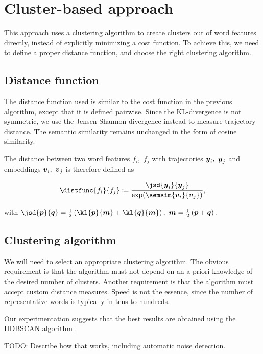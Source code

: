 \section{Cluster-based approach}
This approach uses a clustering algorithm to create clusters out of word features directly, instead of explicitly minimizing a cost function. To achieve this, we need to define a proper distance function, and choose the right clustering algorithm.

\subsection{Distance function}
The distance function used is similar to the cost function in the previous algorithm, except that it is defined pairwise. Since the KL-divergence is not symmetric, we use the Jensen-Shannon divergence instead to measure trajectory distance. The semantic similarity remains unchanged in the form of cosine similarity.

The distance between two word features $f_{i}$,\ $f_{j}$ with trajectories $\vect{\traj}_{i},\ \vect{\traj}_{j}$ and embeddings $\embed_{i},\ \embed_{j}$ is therefore defined as

\begin{equation}
	\distfunc{f_{i}}{f_{j}} \coloneqq \frac{\jsd{\vect{\traj}_{i}}{\vect{\traj}_{j}}}{\exp(\semsim{\embed_{i}}{\embed_{j}})},
\end{equation}

with $\jsd{\vect{p}}{\vect{q}} = \frac{1}{2} \left( \kl{\vect{p}}{\vect{m}} + \kl{\vect{q}}{\vect{m}} \right) ,\ \vect{m} = \frac{1}{2} \left( \vect{p} + \vect{q} \right)$.


\subsection{Clustering algorithm}
We will need to select an appropriate clustering algorithm. The obvious requirement is that the algorithm must not depend on an a priori knowledge of the desired number of clusters. Another requirement is that the algorithm must accept custom distance measures. Speed is not the essence, since the number of representative words is typically in tens to hundreds.

Our experimentation suggests that the best results are obtained using the HDBSCAN algorithm \cite{hdbscan}.

{\color{red} TODO: Describe how that works, including automatic noise detection.}

